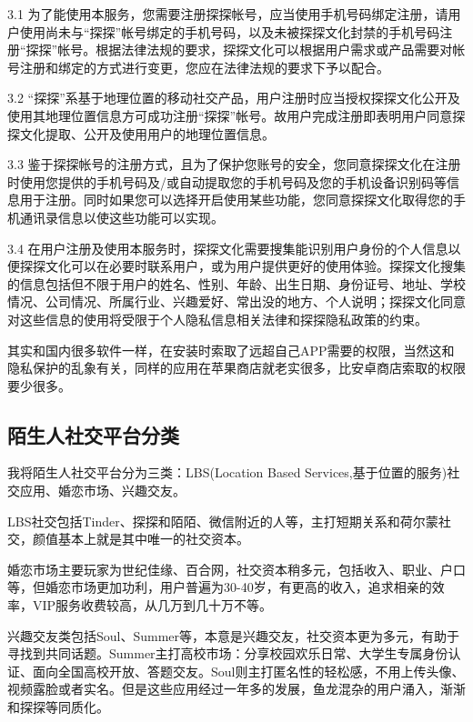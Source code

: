 \documentclass[UTF8]{ctexart}
\begin{document}
\begin{tcolorbox}
    3.1 为了能使用本服务，您需要注册探探帐号，应当使用手机号码绑定注册，请用户使用尚未与“探探”帐号绑定的手机号码，以及未被探探文化封禁的手机号码注册“探探”帐号。根据法律法规的要求，探探文化可以根据用户需求或产品需要对帐号注册和绑定的方式进行变更，您应在法律法规的要求下予以配合。

    3.2 “探探”系基于地理位置的移动社交产品，用户注册时应当授权探探文化公开及使用其地理位置信息方可成功注册“探探”帐号。故用户完成注册即表明用户同意探探文化提取、公开及使用用户的地理位置信息。

    3.3 鉴于探探帐号的注册方式，且为了保护您账号的安全，您同意探探文化在注册时使用您提供的手机号码及/或自动提取您的手机号码及您的手机设备识别码等信息用于注册。同时如果您可以选择开启使用某些功能，您同意探探文化取得您的手机通讯录信息以使这些功能可以实现。

    3.4 在用户注册及使用本服务时，探探文化需要搜集能识别用户身份的个人信息以便探探文化可以在必要时联系用户，或为用户提供更好的使用体验。探探文化搜集的信息包括但不限于用户的姓名、性别、年龄、出生日期、身份证号、地址、学校情况、公司情况、所属行业、兴趣爱好、常出没的地方、个人说明；探探文化同意对这些信息的使用将受限于个人隐私信息相关法律和探探隐私政策的约束。\cite{MoMoAgreement}
\end{tcolorbox}

其实和国内很多软件一样，在安装时索取了远超自己APP需要的权限，当然这和隐私保护的乱象有关，同样的应用在苹果商店就老实很多，比安卓商店索取的权限要少很多。

\subsection{陌生人社交平台分类}
我将陌生人社交平台分为三类：LBS(Location Based Services,基于位置的服务)社交应用、婚恋市场、兴趣交友。

LBS社交包括Tinder、探探和陌陌、微信附近的人等，主打短期关系和荷尔蒙社交，颜值基本上就是其中唯一的社交资本。

婚恋市场主要玩家为世纪佳缘、百合网，社交资本稍多元，包括收入、职业、户口等，但婚恋市场更加功利，用户普遍为30-40岁，有更高的收入，追求相亲的效率，VIP服务收费较高，从几万到几十万不等。

兴趣交友类包括Soul、Summer等，本意是兴趣交友，社交资本更为多元，有助于寻找到共同话题。Summer主打高校市场：分享校园欢乐日常、大学生专属身份认证、面向全国高校开放、答题交友。Soul则主打匿名性的轻松感，不用上传头像、视频露脸或者实名。但是这些应用经过一年多的发展，鱼龙混杂的用户涌入，渐渐和探探等同质化。
\end{document}
